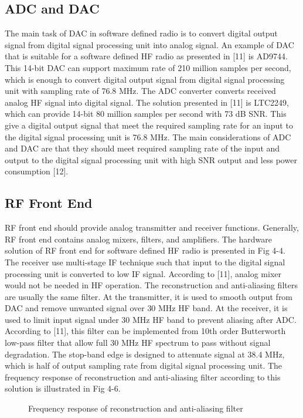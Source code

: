 \documentclass[conference]{IEEEtran}
\begin{document}
\subsection{ADC and DAC}
The main task of DAC in software defined radio is to convert digital output signal from digital signal processing unit into analog signal. An example of DAC that is suitable for a software defined HF radio as presented in [11] is AD9744. This 14-bit DAC can support maximum rate of 210 million samples per second, which is enough to convert digital output signal from digital signal processing unit with sampling rate of 76.8 MHz.
The ADC converter converts received analog HF signal into digital signal. The solution presented in [11] is LTC2249, which can provide 14-bit 80 million samples per second with 73 dB SNR. This give a digital output signal that meet the required sampling rate for an input to the digital signal processing unit is 76.8 MHz. 
The main considerations of ADC and DAC are that they should meet required sampling rate of the input and output to the digital signal processing unit with high SNR output and less power consumption [12].
\subsection{RF Front End}
RF front end should provide analog transmitter and receiver functions. Generally, RF front end contains analog mixers, filters, and amplifiers. The hardware solution of RF front end for software defined HF radio is presented in Fig 4-4. The receiver use multi-stage IF technique such that input to the digital signal processing unit is converted to low IF signal. According to [11], analog mixer would not be needed in HF operation.
The reconstruction and anti-aliasing filters are usually the same filter. At the transmitter, it is used to smooth output from DAC and remove unwanted signal over 30 MHz HF band. At the receiver, it is used to limit input signal under 30 MHz HF band to prevent aliasing after ADC. According to [11], this filter can be implemented from 10th order Butterworth low-pass filter that allow full 30 MHz HF spectrum to pass without signal degradation. The stop-band edge is designed to attenuate signal at 38.4 MHz, which is half of output sampling rate from digital signal processing unit. The frequency response of reconstruction and anti-aliasing filter according to this solution is illustrated in Fig 4-6.

\begin{figure}[h!]
	\centering
	\caption{Frequency response of reconstruction and anti-aliasing filter}
\end{figure}
\end{document}
